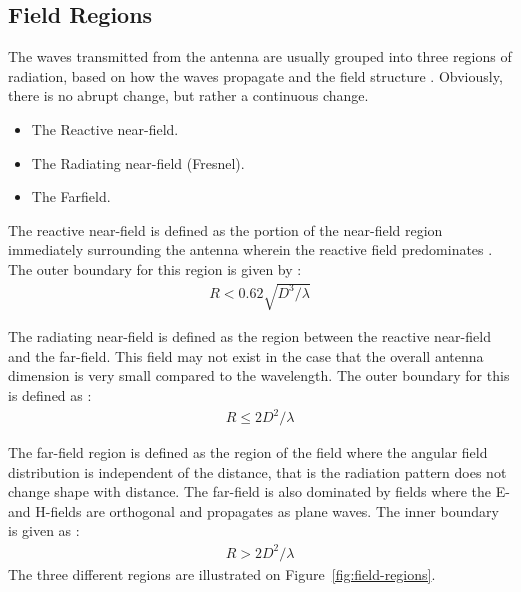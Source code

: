 \subsection{Field Regions}
The waves transmitted from the antenna are usually grouped into three regions of radiation, based on how the waves propagate and the field structure \cite{balanis2012antenna}. Obviously, there is no abrupt change, but rather a continuous change.
\begin{itemize}
\item The Reactive near-field.
\item The Radiating near-field (Fresnel).
\item The Farfield.
\end{itemize}

The reactive near-field is defined as the portion of the near-field region immediately surrounding the antenna wherein the reactive field predominates \cite{balanis2012antenna}. The outer boundary for this region is given by \cite{balanis2012antenna}:
\begin{align} %
  R < 0.62 \sqrt{D^3/\lambda}
\end{align}

The radiating near-field is defined as the region between the reactive near-field and the far-field. This field may not exist in the case that the overall antenna dimension is very small compared to the wavelength. The outer boundary for this is defined as \cite{balanis2012antenna}:
\begin{align} %
  R \leq 2D^2/\lambda
\end{align}

The far-field region is defined as the region of the field where the angular field distribution is independent of the distance, that is the radiation pattern does not change shape with distance. The far-field is also dominated by fields where the E- and H-fields are orthogonal and propagates as plane waves. The inner boundary is given as \cite{balanis2012antenna}:
\begin{align} %
  R > 2D^2/\lambda
\end{align}
The three different regions are illustrated on Figure~\ref{fig:field-regions}. 

